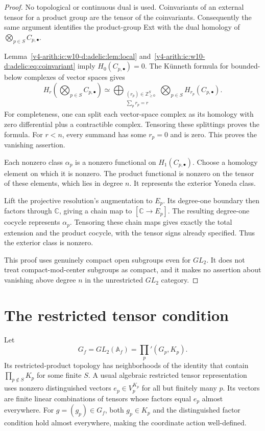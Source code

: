 \begin{proof}
No topological
or continuous dual is used. Coinvariants of an external tensor for a
product group are the tensor of the coinvariants. Consequently the same
argument identifies the product-group Ext with the dual homology of
$\bigotimes_{p\in S}C_{p,\bullet}$.

Lemma~\ref{v4-arith:ic:w10-d:adelic:lem:local} and~\eqref{v4-arith:ic:w10-d:adelic:eq:coinvariant} imply
$H_0(C_{p,\bullet})=0$. The K\"unneth formula for bounded-below complexes
of vector spaces gives
\[
 H_r\left(\bigotimes_{p\in S}C_{p,\bullet}\right)
 \simeq\bigoplus_{\substack{(r_p)\in\mathbb Z_{\ge0}^{S}\\\sum_pr_p=r}}
       \bigotimes_{p\in S}H_{r_p}(C_{p,\bullet}).
\]
For completeness, one can split each vector-space complex as its homology
with zero differential plus a contractible complex. Tensoring these
splittings proves the formula. For $r<n$, every summand has some $r_p=0$
and is zero. This proves the vanishing assertion.

Each nonzero class $\alpha_p$ is a nonzero functional on
$H_1(C_{p,\bullet})$. Choose a homology element on which it is nonzero.
The product functional is nonzero on the tensor of these elements,
which lies in degree $n$. It represents the exterior Yoneda class.

Lift the projective resolution's augmentation to $E_p$.
Its degree-one boundary then factors through $\mathbb C$,
giving a chain map to $[\mathbb C\to E_p]$. The resulting degree-one cocycle represents $\alpha_p$.
Tensoring these chain maps gives exactly the total extension and the
product cocycle, with the tensor signs already specified.
Thus the exterior class is nonzero.

This proof uses genuinely compact open subgroups even for $GL_2$.
It does not treat compact-mod-center subgroups as compact, and it makes
no assertion about vanishing above degree $n$ in the unrestricted
$GL_2$ category.
\end{proof}

\section{The restricted tensor condition}

Let
\[
 G_f=GL_2(\mathbb A_f)=\prod_p'(G_p,K_p).
\]
Its restricted-product topology has neighborhoods of the identity that
contain $\prod_{p\notin S}K_p$ for some finite $S$. A usual algebraic
restricted tensor representation uses nonzero distinguished vectors
$e_p\in V_p^{K_p}$ for all but finitely many $p$. Its vectors are finite
linear combinations of tensors whose factors equal $e_p$ almost
everywhere. For $g=(g_p)\in G_f$, both $g_p\in K_p$ and the distinguished
factor condition hold almost everywhere, making the coordinate action
well-defined.

